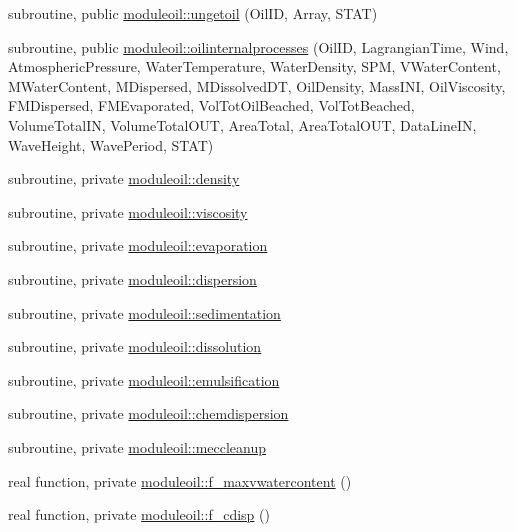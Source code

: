\begin{DoxyCompactItemize}
subroutine, public \mbox{\hyperlink{namespacemoduleoil_a2fe92325448f8b8b46f0b9a6c44129c1}{moduleoil\+::ungetoil}} (Oil\+ID, Array, S\+T\+AT)
\item 
subroutine, public \mbox{\hyperlink{namespacemoduleoil_a4b104a789e2f264a4494966c5b9a47fd}{moduleoil\+::oilinternalprocesses}} (Oil\+ID, Lagrangian\+Time, Wind, Atmospheric\+Pressure, Water\+Temperature, Water\+Density, S\+PM, V\+Water\+Content, M\+Water\+Content, M\+Dispersed, M\+Dissolved\+DT, Oil\+Density, Mass\+I\+NI, Oil\+Viscosity, F\+M\+Dispersed, F\+M\+Evaporated, Vol\+Tot\+Oil\+Beached, Vol\+Tot\+Beached, Volume\+Total\+IN, Volume\+Total\+O\+UT, Area\+Total, Area\+Total\+O\+UT, Data\+Line\+IN, Wave\+Height, Wave\+Period, S\+T\+AT)
\item 
subroutine, private \mbox{\hyperlink{namespacemoduleoil_a9b26683d1a6211ffa180e7c4004596be}{moduleoil\+::density}}
\item 
subroutine, private \mbox{\hyperlink{namespacemoduleoil_a2aaa2968f62ce93c4b499b8b91d86e75}{moduleoil\+::viscosity}}
\item 
subroutine, private \mbox{\hyperlink{namespacemoduleoil_a057ec48dbb4ce23ac0814ed1bdc90cc4}{moduleoil\+::evaporation}}
\item 
subroutine, private \mbox{\hyperlink{namespacemoduleoil_af31781708e110ef05e0de36924287137}{moduleoil\+::dispersion}}
\item 
subroutine, private \mbox{\hyperlink{namespacemoduleoil_a9a79912febfdb0e994ca0e98a2f342bc}{moduleoil\+::sedimentation}}
\item 
subroutine, private \mbox{\hyperlink{namespacemoduleoil_a1eb8385a1fb72338d92a438deda6ddb1}{moduleoil\+::dissolution}}
\item 
subroutine, private \mbox{\hyperlink{namespacemoduleoil_ab22a55bb01358e1000d700bd0b2eebe3}{moduleoil\+::emulsification}}
\item 
subroutine, private \mbox{\hyperlink{namespacemoduleoil_a0787ef4a57eb2967c2704c9a3fe30dbf}{moduleoil\+::chemdispersion}}
\item 
subroutine, private \mbox{\hyperlink{namespacemoduleoil_a2e2c8b7a65ec01bb12cb4ae2225bc7e2}{moduleoil\+::meccleanup}}
\item 
real function, private \mbox{\hyperlink{namespacemoduleoil_ac29f4466dc5d483c853827737c3aa61e}{moduleoil\+::f\+\_\+maxvwatercontent}} ()
\item 
real function, private \mbox{\hyperlink{namespacemoduleoil_af8b321b109edae35b2e3314b4cae8ee3}{moduleoil\+::f\+\_\+cdisp}} ()
\item 

\end{DoxyCompactItemize}
